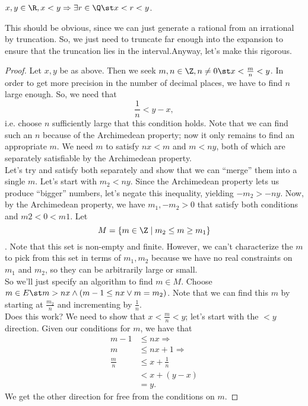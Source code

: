 \documentclass{notes}
\begin{document}
\begin{theorem}[$\Q$ Dense in $\R$]
  $x,y\in\R, x < y \Rightarrow \exists r\in\Q \st x < r < y$.
\end{theorem}
This should be obvious, since we can just generate a rational from an irrational by truncation. So,
we just need to truncate far enough into the expansion to ensure that the truncation lies in the 
interval.Anyway, let's make this rigorous.
\begin{proof}
  Let $x,y$ be as above. Then we seek $m,n\in\Z, n\neq 0 \st x < \frac{m}{n} < y$. In order to get 
  more precision in the number of decimal places, we have to find $n$ large enough. So, we need that
  $$\frac{1}{n} < y-x,$$ i.e. choose $n$ sufficiently large that this condition holds. Note that we 
  can find such an $n$ because of the Archimedean property; now it only remains to find an appropriate
  $m$. We need $m$ to satisfy $nx < m$ and $m < ny$, both of which are separately satisfiable by the
  Archimedean property. \\

  Let's try and satisfy both separately and show that we can ``merge'' them into a single $m$. Let's 
  start with $m_2 < ny$. Since the Archimedean property lets us produce ``bigger'' numbers, let's 
  negate this inequality, yielding $-m_2 > -ny$. Now, by the Archimedean property, we have $m_1, 
  -m_2 > 0$ that satisfy both conditions and $m2 < 0 < m1$. Let $$M = \{m\in\Z\mid m_2 \leq m \geq m_1\}$$.
  Note that this set is non-empty and finite. However, we can't characterize the $m$ to pick from this
  set in terms of $m_1, m_2$ because we have no real constraints on $m_1$ and $m_2$, so they can be
  arbitrarily large or small. \\

  So we'll just specify an algorithm to find $m\in M$. Choose $m\in E \st m > nx \wedge (m - 1 \leq 
  nx \vee m = m_2)$.  Note that we can find this $m$ by starting at $\frac{m_2}{n}$ and incrementing
  by $\frac{1}{n}$. \\

  Does this work? We need to show that $x < \frac{m}{n} < y$; let's start with the $ < y$ direction.
  Given our conditions for $m$, we have that 
  \begin{align*}
    m - 1 &\leq nx \Rightarrow \\
    m &\leq nx + 1 \Rightarrow \\
    \frac{m}{n} &\leq x + \frac{1}{n} \\
                &< x + (y - x) \\
                &= y.
  \end{align*}
  We get the other direction for free from the conditions on $m$.
\end{proof}
\end{document}
